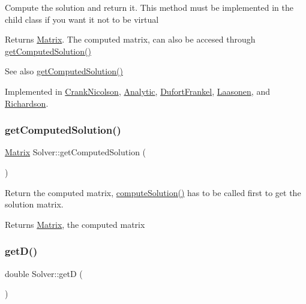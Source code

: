 Compute the solution and return it. This method must be implemented in the child class if you want it not to be virtual \begin{DoxyReturn}{Returns}
\mbox{\hyperlink{classMatrix}{Matrix}}. The computed matrix, can also be accesed through \mbox{\hyperlink{classSolver_aafe88ce4130c001052e5d93c1681f90f}{get\+Computed\+Solution()}} 
\end{DoxyReturn}
\begin{DoxySeeAlso}{See also}
\mbox{\hyperlink{classSolver_aafe88ce4130c001052e5d93c1681f90f}{get\+Computed\+Solution()}} 
\end{DoxySeeAlso}


Implemented in \mbox{\hyperlink{classCrankNicolson_a94af3b8a56ef40966ea2ccd2629c2eb2}{Crank\+Nicolson}}, \mbox{\hyperlink{classAnalytic_aaa59a993d9c1a9b9c5b581f8f3e9c5b3}{Analytic}}, \mbox{\hyperlink{classDufortFrankel_aad9f0443398cd3f32b44739c1133fa94}{Dufort\+Frankel}}, \mbox{\hyperlink{classLaasonen_ae16757353c84d22b3a444116a64a6375}{Laasonen}}, and \mbox{\hyperlink{classRichardson_a8d2471f20a6b433cf7ccf5a4817b14a3}{Richardson}}.

\mbox{\label{classSolver_aafe88ce4130c001052e5d93c1681f90f}} 
\subsubsection{\texorpdfstring{get\+Computed\+Solution()}{getComputedSolution()}}
{\footnotesize\ttfamily \mbox{\hyperlink{classMatrix}{Matrix}} Solver\+::get\+Computed\+Solution (\begin{DoxyParamCaption}{ }\end{DoxyParamCaption})}

Return the computed matrix, \mbox{\hyperlink{classSolver_a0f4ecfaed825407019995b5176e25748}{compute\+Solution()}} has to be called first to get the solution matrix. \begin{DoxyReturn}{Returns}
\mbox{\hyperlink{classMatrix}{Matrix}}, the computed matrix 
\end{DoxyReturn}
\mbox{\label{classSolver_a3b4da24979dd1c316c860749bbf6e3af}} 
\subsubsection{\texorpdfstring{get\+D()}{getD()}}
{\footnotesize\ttfamily double Solver\+::getD (\begin{DoxyParamCaption}{ }\end{DoxyParamCaption})}

